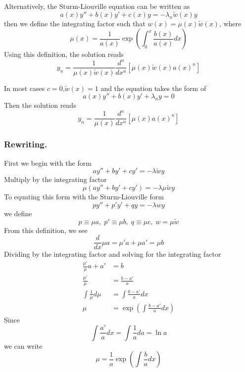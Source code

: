 \documentclass[../main.tex]{subfiles}
\begin{document}
Alternatively, the Sturm-Liouville equation can be written as
\begin{equation*}
    a(x)y''+b(x)y'+c(x)y=-\lambda_n \tilde{w}(x)y
\end{equation*}
then we define the integrating factor such that $w(x)=\mu(x)\tilde{w}(x)$, where
\begin{equation*}
    \mu(x)=\frac{1}{a(x)}\exp\left(\int_0^x \frac{b(x)}{a(x)}dx\right)
\end{equation*}
Using this definition, the solution reads
\begin{equation*}
    y_n=\frac{1}{\mu(x)\tilde{w}(x)}\frac{d^n}{dx^n}[\mu(x)\tilde{w}(x)a(x)^n]
\end{equation*}

In most cases $c=0$,$\tilde{w}(x)=1$ and the equation takes the form of
\begin{equation*}
    a(x)y''+b(x)y'+\lambda_ny=0
\end{equation*}
Then the solution reads
\begin{equation*}
    y_n=\frac{1}{\mu(x)}\frac{d^n}{dx^n}[\mu(x)a(x)^n]
\end{equation*}

\subsubsection*{Rewriting.} First we begin with the form
\begin{equation*}
    ay''+by'+cy'=-\lambda \tilde{w}y
\end{equation*}
Multiply by the integrating factor
\begin{equation*}
    \mu(ay''+by'+cy')=-\lambda \mu \tilde{w}y
\end{equation*}
To equating this form with the Sturm-Liouville form
\begin{equation*}
    py''+p'y'+qy=-\lambda w y
\end{equation*}
we define
\begin{equation*}
    p\equiv\mu a,\;p'\equiv \mu b,\;q\equiv\mu c,\;w=\mu\tilde{w}
\end{equation*}
From this definition, we see
\begin{equation*}
    \frac{d}{dx}\mu a=\mu' a+\mu a'=\mu b
\end{equation*}
Dividing by the integrating factor and solving for the integrating factor
\begin{align*}
    \frac{\mu'}{\mu}a+a'  & =b                                     \\
    \frac{\mu'}{\mu}      & =\frac{b-a'}{a}                        \\
    \int\frac{1}{\mu}d\mu & =\int\frac{b-a'}{a}dx                  \\
    \mu                   & =\exp\left(\int\frac{b-a'}{a}dx\right)
\end{align*}
Since
\begin{equation*}
    \int\frac{a'}{a}dx=\int\frac{1}{a}da=\ln a
\end{equation*}
we can write
\begin{equation*}
    \mu=\frac{1}{a}\exp\left(\int\frac{b}{a}dx\right)
\end{equation*}
\end{document}
